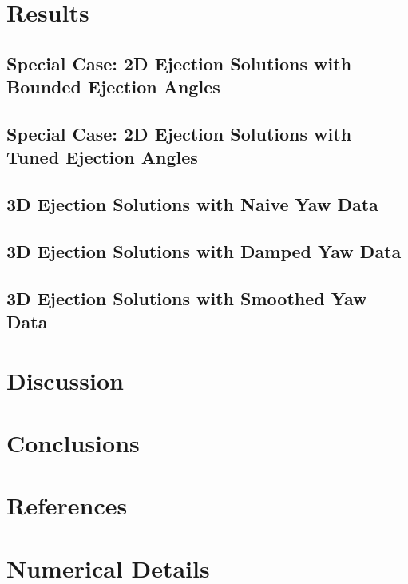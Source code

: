 \documentclass[10pt,twocolumn,reqno]{amsart}
\begin{document}
\section{Results}
\subsection{Special Case: 2D Ejection Solutions with Bounded Ejection Angles}

\subsection{Special Case: 2D Ejection Solutions with Tuned Ejection Angles}

\subsection{3D Ejection Solutions with Naive Yaw Data}

\subsection{3D Ejection Solutions with Damped Yaw Data}

\subsection{3D Ejection Solutions with Smoothed Yaw Data}


\section{Discussion}

\section{Conclusions}

\section{References}

\pagebreak
\appendix
\section{Numerical Details}
\end{document}

